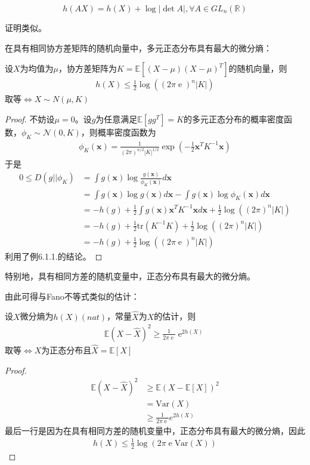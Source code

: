 \documentclass{ctexbook}
\DeclareMathOperator{\e}{e}
\begin{document}
\begin{theorem}
    $$h(AX)=h(X)+\log |\det A|,\forall A\in GL_n(\mathbb{R})$$
\end{theorem}

证明类似。

在具有相同协方差矩阵的随机向量中，多元正态分布具有最大的微分熵：
\begin{theorem}
    设$X$为均值为$\mu$，协方差矩阵为$K=\mathbb{E}[(X-\mu)(X-\mu)^T]$的随机向量，则\begin{align*}
        h(X)\leq \frac{1}{2}\log((2\pi \e)^n|K|)
    \end{align*}
    取等$\iff X\sim N(\mu,K)$
\end{theorem}
\begin{proof}
    不妨设$\mu=0$。设$g$为任意满足$\mathbb{E}[gg^T]=K$的多元正态分布的概率密度函数，$\phi_K\sim \mathcal{N}(0,K)$，则概率密度函数为\begin{align*}
        \phi_K(\mathbf{x})=\frac{1}{(2\pi)^{n/2}|K|^{1/2}}\exp\left(-\frac{1}{2}\mathbf{x}^T K^{-1} \mathbf{x}\right)
    \end{align*}
    于是
    \begin{align*}
        0\leq D(g||\phi_K)&=\int g(\mathbf{x})\log \frac{g(\mathbf{x})}{\phi_K(\mathbf{x})}d\mathbf{x}\\
        &=\int g(\mathbf{x})\log g(\mathbf{x})d\mathbf{x}-\int g(\mathbf{x})\log \phi_K(\mathbf{x})d\mathbf{x}\\
        &=-h(g)+\frac{1}{2}\int g(\mathbf{x})\mathbf{x}^T K^{-1} \mathbf{x}d\mathbf{x}+\frac{1}{2}\log((2\pi)^n|K|)\\
        &=-h(g)+\frac{1}{2}\text{tr}(K^{-1}K)+\frac{1}{2}\log((2\pi)^n|K|)\\
        &=-h(g)+\frac{1}{2}\log((2\pi \e)^n|K|)
    \end{align*}
    利用了例6.1.1.的结论。
\end{proof}

特别地，具有相同方差的随机变量中，正态分布具有最大的微分熵。

由此可得与Fano不等式类似的估计：

\begin{theorem}
    设$X$微分熵为$h(X)(nat)$，常量$\hat{X}$为$X$的估计，则\begin{align*}
        \mathbb{E} (X-\hat{X})^2\geq \frac{1}{2\pi \e}\e^{2h(X)}
    \end{align*}
    取等$\iff X$为正态分布且$\hat{X}=\mathbb{E} [X]$
\end{theorem}
\begin{proof}
    \begin{align*}
        \mathbb{E} (X-\hat{X})^2&\geq \mathbb{E} (X-\mathbb{E} [X])^2\\
        &=\text{Var}(X)\\
        &\geq \frac{1}{2\pi \e}e^{2h(X)}
    \end{align*}
    最后一行是因为在具有相同方差的随机变量中，正态分布具有最大的微分熵，因此\begin{align*}
        h(X)\leq \frac{1}{2}\log(2\pi \e\text{Var}(X))
    \end{align*}
\end{proof}
\end{document}
